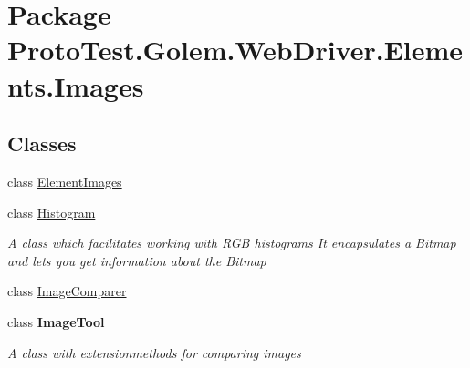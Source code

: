 \hypertarget{namespace_proto_test_1_1_golem_1_1_web_driver_1_1_elements_1_1_images}{\section{Package Proto\-Test.\-Golem.\-Web\-Driver.\-Elements.\-Images}
\label{namespace_proto_test_1_1_golem_1_1_web_driver_1_1_elements_1_1_images}
}
\subsection*{Classes}
\begin{DoxyCompactItemize}
\item 
class \hyperlink{class_proto_test_1_1_golem_1_1_web_driver_1_1_elements_1_1_images_1_1_element_images}{Element\-Images}
\item 
class \hyperlink{class_proto_test_1_1_golem_1_1_web_driver_1_1_elements_1_1_images_1_1_histogram}{Histogram}
\begin{DoxyCompactList}\small\item\em A class which facilitates working with R\-G\-B histograms It encapsulates a Bitmap and lets you get information about the Bitmap \end{DoxyCompactList}\item 
class \hyperlink{class_proto_test_1_1_golem_1_1_web_driver_1_1_elements_1_1_images_1_1_image_comparer}{Image\-Comparer}
\item 
class {\bfseries Image\-Tool}
\begin{DoxyCompactList}\small\item\em A class with extensionmethods for comparing images \end{DoxyCompactList}\end{DoxyCompactItemize}
